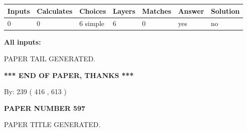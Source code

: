 \documentclass{ctexart}
\begin{document}
 
   
   
   
   
\noindent\begin{tabular}{|l|l|l|l|l|l|l|}
 \hline
Inputs & Calculates & Choices & Layers & Matches & Answer & Solution \\ \hline
 0  & 
 0  & 
 6
  simple  
  & 
 6  & 
 0  & 
  yes & 
  no 
  \\ \hline
 \end{tabular}
   
   
   
   
\noindent{}
   
   
   
   
\noindent\vspace{0.1in}\hspace{-0.08in} {\textbf{\Large{All inputs: }}}
   
   
   
   
   
   
 \vspace{0.2in}
 
   
   
\vspace{2.0in} PAPER TAIL GENERATED.
   
   
   
   
\vspace{1.0in} 
{\textbf{\large{ *** END OF PAPER, THANKS *** }}} 
   
   
\hspace{1.0in} By: 
 239 ( 416 ,  613 )
   
   
   
   
\newpage 
\setcounter{page}{ 
   597001 } 
   
   
   
   
 {\textbf{ \Large{ PAPER NUMBER  597  }}}
   
   
\vspace{0.2in}
   
   
   
   
   
   
   
   
 \vspace{0.2in}
 
 
 
 
   
   
 PAPER TITLE GENERATED.
   
\end{document}
